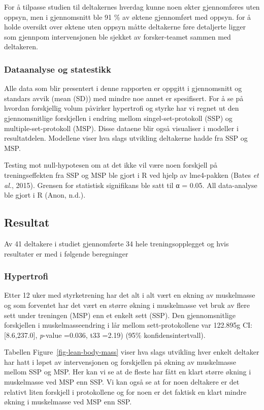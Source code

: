 \documentclass[
  letterpaper,
  DIV=11,
  numbers=noendperiod]{scrreprt}
\begin{document}
For å tilpasse studien til deltakernes hverdag kunne noen økter
gjennomføres uten oppsyn, men i gjennomsnitt ble 91 \% av øktene
gjennomført med oppsyn. for å holde oversikt over øktene uten oppsyn
måtte deltakerne føre detaljerte ligger som gjennpom intervensjonen ble
sjekket av forsker-teamet sammen med deltakeren.

\subsubsection{Dataanalyse og
statestikk}\label{dataanalyse-og-statestikk}

Alle data som blir presentert i denne rapporten er oppgitt i
gjennomsnitt og standars avvik (mean (SD)) med mindre noe annet er
spesifisert. For å se på hvordan forskjellig volum påvirker hypertrofi
og styrke har vi regnet ut den gjennomsnitlige forskjellen i endring
mellom singel-set-protokoll (SSP) og multiple-set-protokoll (MSP). Disse
dataene blir også visualiser i modeller i resultatdelen. Modellene viser
hva slags utvikling deltakerne hadde fra SSP og MSP.

Testing mot null-hypotesen om at det ikke vil være noen forskjell på
treningseffekten fra SSP og MSP ble gjort i R ved hjelp av lme4-pakken
(Bates \emph{et al.}, 2015). Grensen for statistisk signifikans ble satt
til α = 0.05. All data-analyse ble gjort i R (Anon, n.d.).

\subsection{Resultat}\label{resultat-1}

Av 41 deltakere i studiet gjennomførte 34 hele treningsopplegget og hvis
resultater er med i følgende beregninger

\subsubsection{Hypertrofi}\label{hypertrofi}

Etter 12 uker med styrketrening har det alt i alt vært en økning av
muskelmasse og som forventet har det vært en større økning i muskelmasse
vet bruk av flere sett under treningen (MSP) enn et enkelt sett (SSP).
Den gjennomsnitlige forskjellen i muskelmasseendring i lår mellom
sett-protokollene var 122.895g CI: {[}8.6,237.0{]}, \emph{p}-value
=0.036, t33 =2.19) (95\% konfidensintertvall).

Tabellen Figure~\ref{fig-lean-body-mass} viser hva slags utvikling hver
enkelt deltaker har hatt i løpet av intervensjonen og forskjellen på
økning av muskelmasse mellom SSP og MSP. Her kan vi se at de fleste har
fått en klart større økning i muskelmasse ved MSP enn SSP. Vi kan også
se at for noen deltakere er det relativt liten forskjell i protokollene
og for noen er det faktisk en klart mindre økning i muskelmasse ved MSP
enn SSP.
\end{document}

